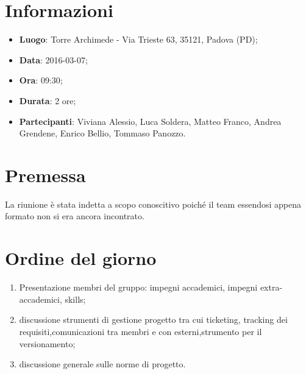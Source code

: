 \documentclass[a4paper,titlepage]{article}
\begin{document}
\maketitle

\newpage
\tableofcontents

\newpage
\section{Informazioni}
\label{sec:Informazioni}

\begin{itemize}
  \item \textbf{Luogo}: Torre Archimede - Via Trieste 63, 35121, Padova (PD);
  \item \textbf{Data}: 2016-03-07;
  \item \textbf{Ora}: 09:30;
  \item \textbf{Durata}: 2 ore;
  \item \textbf{Partecipanti}: Viviana Alessio, Luca Soldera, Matteo Franco, Andrea Grendene, Enrico Bellio, Tommaso Panozzo.
\end{itemize}

\newpage
\section{Premessa}

La riunione è stata indetta a scopo conoscitivo poiché il team essendosi appena formato non si era ancora incontrato.

\section{Ordine del giorno}
\label{sec:OrdineDelGiorno}
\begin{enumerate}
  \item Presentazione membri del gruppo: impegni accademici, impegni extra-accademici, skills;
  \item discussione strumenti di gestione progetto tra cui ticketing, tracking dei requisiti,comunicazioni tra membri e con esterni,strumento per il versionamento; %
  \item discussione generale sulle norme di progetto.
\end{enumerate}
\end{document}
